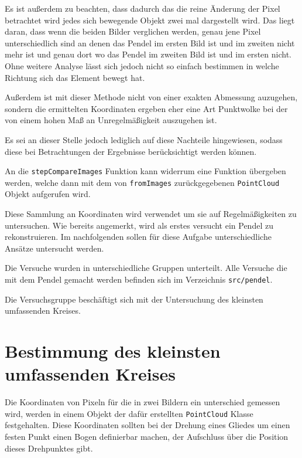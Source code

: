 Es ist au{\ss}erdem zu beachten, dass dadurch das die reine Änderung der Pixel betrachtet wird jedes sich bewegende Objekt zwei mal dargestellt wird.
Das liegt daran, dass wenn die beiden Bilder verglichen werden, genau jene Pixel unterschiedlich sind an denen das Pendel im ersten Bild ist und im zweiten nicht mehr ist und genau dort wo das Pendel im zweiten Bild ist und im ersten nicht.
Ohne weitere Analyse lässt sich jedoch nicht so einfach bestimmen in welche Richtung sich das Element bewegt hat.

Au{\ss}erdem ist mit dieser Methode nicht von einer exakten Abmessung auzugehen, sondern die ermittelten Koordinaten ergeben eher eine Art Punktwolke bei der von einem hohen Ma{\ss} an Unregelmä{\ss}igkeit auszugehen ist.

Es sei an dieser Stelle jedoch lediglich auf diese Nachteile hingewiesen, sodass diese bei Betrachtungen der Ergebnisse berücksichtigt werden können.

An die \lstinline{stepCompareImages} Funktion kann widerrum eine Funktion übergeben werden, welche dann mit dem von \lstinline{fromImages} zurückgegebenen \lstinline{PointCloud} Objekt aufgerufen wird.

Diese Sammlung an Koordinaten wird verwendet um sie auf Regelmä{\ss}igkeiten zu untersuchen.
Wie bereits angemerkt, wird als erstes versucht ein Pendel zu rekonstruieren.
Im nachfolgenden sollen für diese Aufgabe unterschiedliche Ansätze untersucht werden.

Die Versuche wurden in unterschiedliche Gruppen unterteilt.
Alle Versuche die mit dem Pendel gemacht werden befinden sich im Verzeichnis \lstinline{src/pendel}.

Die Versuchsgruppe  beschäftigt sich mit der Untersuchung des kleinsten umfassenden Kreises. %

\section{Bestimmung des kleinsten umfassenden Kreises}

Die Koordinaten von Pixeln für die in zwei Bildern ein unterschied gemessen wird, werden in einem Objekt der dafür erstellten \lstinline{PointCloud} Klasse festgehalten.
Diese Koordinaten sollten bei der Drehung eines Gliedes um einen festen Punkt einen Bogen definierbar machen, der Aufschluss über die Position dieses Drehpunktes gibt.

